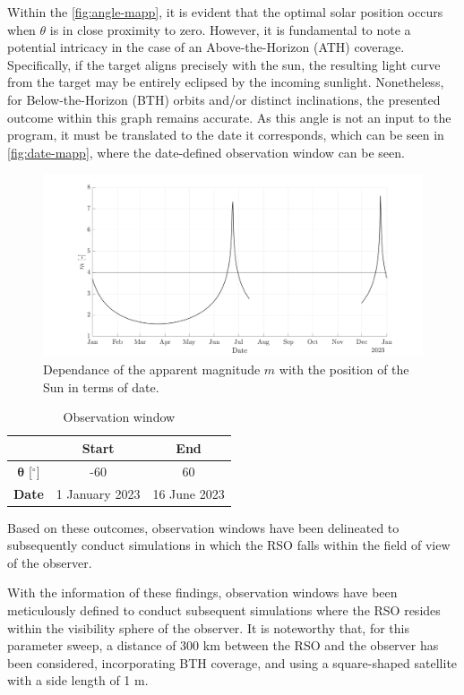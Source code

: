 Within the \autoref{fig:angle-mapp}, it is evident that the optimal solar position occurs when $\theta$ is in close proximity to zero. However, it is fundamental to note a potential intricacy in the case of an Above-the-Horizon (ATH) coverage. Specifically, if the target aligns precisely with the sun, the resulting light curve from the target may be entirely eclipsed by the incoming sunlight. Nonetheless, for Below-the-Horizon (BTH) orbits and/or distinct inclinations, the presented outcome within this graph remains accurate. As this angle is not an input to the program, it must be translated to the date it corresponds, which can be seen in \autoref{fig:date-mapp}, where the date-defined observation window can be seen. 
\begin{figure}[H]
    \centering
    \includegraphics[width=\textwidth]{Figures/date-mapp.png}
    \caption{Dependance of the apparent magnitude $m$ with the position of the Sun in terms of date.}
    \label{fig:date-mapp}
\end{figure}

\begin{table}[H]
    \centering
    \caption{Observation window}
    \begin{tabular}{ccc}
    \toprule
     & \textbf{Start} & \textbf{End} \\
    \midrule
      $\boldsymbol{\theta}$ [$^\circ$]  & -60 & 60 \\
      \textbf{Date} & 1 January 2023 & 16 June 2023 \\
    \bottomrule
    \end{tabular}
    \label{tab:ventanas}
\end{table}

Based on these outcomes, observation windows have been delineated to subsequently conduct simulations in which the RSO falls within the field of view of the observer. 

With the information of these findings, observation windows have been meticulously defined to conduct subsequent simulations where the RSO resides within the visibility sphere of the observer. It is noteworthy that, for this parameter sweep, a distance of 300 km between the RSO and the observer has been considered, incorporating BTH coverage, and using a square-shaped satellite with a side length of 1 m.

